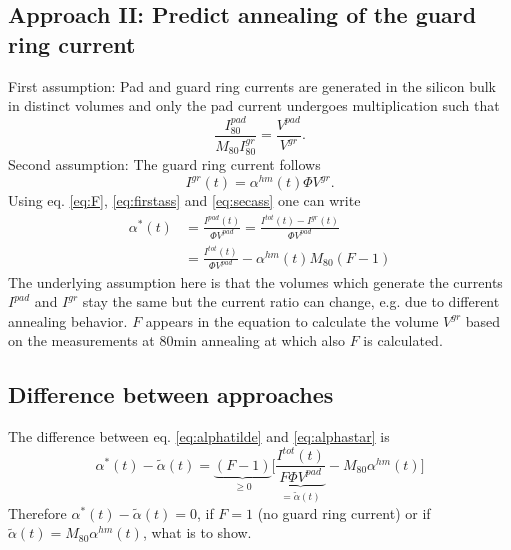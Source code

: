 \documentclass{article}
\begin{document}
\subsection{Approach II: Predict annealing of the guard ring current}
First assumption: Pad and guard ring currents are generated in the silicon bulk in distinct volumes and only the pad current undergoes multiplication such that
\begin{equation}\label{eq:firstass}
\frac{I^{pad}_{80}}{M_{80}I^{gr}_{80}}=\frac{V^{pad}}{V^{gr}}.
\end{equation}
Second assumption: The guard ring current follows
\begin{equation}\label{eq:secass}
I^{gr}(t)=\alpha^{hm}(t)\Phi V^{gr}.
\end{equation}
Using eq. \ref{eq:F}, \ref{eq:firstass} and \ref{eq:secass} one can write
\begin{align}
\alpha^{\ast}(t)&=\frac{I^{pad}(t)}{\Phi V^{pad}}=\frac{I^{tot}(t)-I^{gr}(t)}{\Phi V^{pad}}\\
&=\frac{I^{tot}(t)}{\Phi V^{pad}}-\alpha^{hm}(t)M_{80}(F-1) \label{eq:alphastar}
\end{align}
The underlying assumption here is that the volumes which generate the currents $I^{pad}$ and $I^{gr}$ stay the same but the current ratio can change, e.g. due to different annealing behavior. $F$ appears in the equation to calculate the volume $V^{gr}$ based on the measurements at 80min annealing at which also $F$ is calculated.
\subsection{Difference between approaches}
The difference between eq. \ref{eq:alphatilde} and \ref{eq:alphastar} is
\begin{equation}
\alpha^{\ast}(t)-\tilde{\alpha}(t)=\underbrace{(F-1)}_{\geq 0}\bigg [\underbrace{\frac{I^{tot}(t)}{F \Phi V^{pad}}}_{=\tilde{\alpha}(t)}-M_{80}\alpha^{hm}(t)\bigg ]
\end{equation}
Therefore $\alpha^{\ast}(t)-\tilde{\alpha}(t)=0$, if $F=1$ (no guard ring current) or if ${\tilde{\alpha}(t)=M_{80}\alpha^{hm}(t)}$, what is to show.
\end{document}
